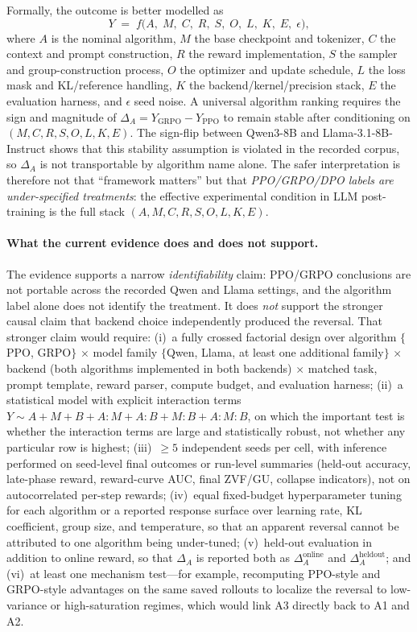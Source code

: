 \documentclass[12pt,a4paper]{report}
\begin{document}
Formally, the outcome is better modelled as
\begin{equation}
  Y \;=\; f\bigl(A,\; M,\; C,\; R,\; S,\; O,\; L,\; K,\; E,\; \epsilon\bigr),
  \label{eq:identifiability}
\end{equation}
where $A$ is the nominal algorithm, $M$ the base checkpoint and tokenizer, $C$ the context and prompt construction, $R$ the reward implementation, $S$ the sampler and group-construction process, $O$ the optimizer and update schedule, $L$ the loss mask and KL/reference handling, $K$ the backend/kernel/precision stack, $E$ the evaluation harness, and $\epsilon$ seed noise. A universal algorithm ranking requires the sign and magnitude of $\Delta_A = Y_{\text{GRPO}} - Y_{\text{PPO}}$ to remain stable after conditioning on $(M, C, R, S, O, L, K, E)$. The sign-flip between Qwen3-8B and Llama-3.1-8B-Instruct shows that this stability assumption is violated in the recorded corpus, so $\Delta_A$ is not transportable by algorithm name alone. The safer interpretation is therefore not that ``framework matters'' but that \emph{PPO/GRPO/DPO labels are under-specified treatments}: the effective experimental condition in LLM post-training is the full stack $(A, M, C, R, S, O, L, K, E)$.

\paragraph{What the current evidence does and does not support.}
The evidence supports a narrow \emph{identifiability} claim: PPO/GRPO conclusions are not portable across the recorded Qwen and Llama settings, and the algorithm label alone does not identify the treatment. It does \emph{not} support the stronger causal claim that backend choice independently produced the reversal. That stronger claim would require:
(i)~a fully crossed factorial design over algorithm $\{$PPO, GRPO$\}$ $\times$ model family $\{$Qwen, Llama, at least one additional family$\}$ $\times$ backend (both algorithms implemented in both backends) $\times$ matched task, prompt template, reward parser, compute budget, and evaluation harness;
(ii)~a statistical model with explicit interaction terms $Y \sim A + M + B + A{:}M + A{:}B + M{:}B + A{:}M{:}B$, on which the important test is whether the interaction terms are large and statistically robust, not whether any particular row is highest;
(iii)~$\geq\!5$ independent seeds per cell, with inference performed on seed-level final outcomes or run-level summaries (held-out accuracy, late-phase reward, reward-curve AUC, final ZVF/GU, collapse indicators), not on autocorrelated per-step rewards;
(iv)~equal fixed-budget hyperparameter tuning for each algorithm or a reported response surface over learning rate, KL coefficient, group size, and temperature, so that an apparent reversal cannot be attributed to one algorithm being under-tuned;
(v)~held-out evaluation in addition to online reward, so that $\Delta_A$ is reported both as $\Delta_A^{\text{online}}$ and $\Delta_A^{\text{heldout}}$; and
(vi)~at least one mechanism test---for example, recomputing PPO-style and GRPO-style advantages on the same saved rollouts to localize the reversal to low-variance or high-saturation regimes, which would link A3 directly back to A1 and A2.
\end{document}
